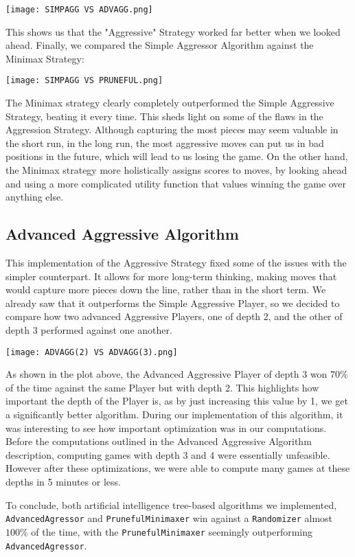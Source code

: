 \documentclass[fontsize=11pt]{article}
\begin{document}
\texttt{[image: SIMPAGG VS ADVAGG.png]}

This shows us that the "Aggressive" Strategy worked far better when we looked ahead. Finally, we compared the Simple Aggressor Algorithm against the Minimax Strategy:

\texttt{[image: SIMPAGG VS PRUNEFUL.png]}

The Minimax strategy clearly completely outperformed the Simple Aggressive Strategy, beating it every time. This sheds light on some of the flaws in the Aggression Strategy. Although capturing the most pieces may seem valuable in the short run, in the long run, the most aggressive moves can put us in bad positions in the future, which will lead to us losing the game. On the other hand, the Minimax strategy more holistically assigns scores to moves, by looking ahead and using a more complicated utility function that values winning the game over anything else. 

\subsection*{Advanced Aggressive Algorithm}
This implementation of the Aggressive Strategy fixed some of the issues with the simpler counterpart. It allows for more long-term thinking, making moves that would capture more pieces down the line, rather than in the short term. We already saw that it outperforms the Simple Aggressive Player, so we decided to compare how two advanced Aggressive Players, one of depth 2, and the other of depth 3 performed against one another.

\texttt{[image: ADVAGG(2) VS ADVAGG(3).png]}

As shown in the plot above, the Advanced Aggressive Player of depth 3 won $70\%$ of the time against the same Player but with depth 2. This highlights how important the depth of the Player is, as by just increasing this value by 1, we get a significantly better algorithm. During our implementation of this algorithm, it was interesting to see how important optimization was in our computations. Before the computations outlined in the Advanced Aggressive Algorithm description, computing games with depth 3 and 4 were essentially unfeasible. However after these optimizations, we were able to compute many games at these depths in 5 minutes or less.  

To conclude, both artificial intelligence tree-based algorithms we implemented, \texttt{AdvancedAgressor} and \texttt{PrunefulMinimaxer} win against a \texttt{Randomizer} almost $100\%$ of the time, with the \texttt{PrunefulMinimaxer} seemingly outperforming \texttt{AdvancedAgressor}.
\end{document}
